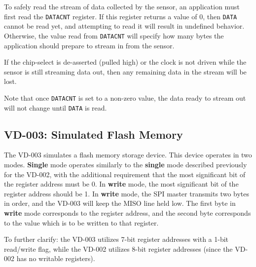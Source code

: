 \documentclass{article}
\begin{document}
To safely read the stream of data collected by the sensor, an application must
first read the \texttt{DATACNT} register. If this register returns a value of
0, then \texttt{DATA} cannot be read yet, and attempting to read it will result
in undefined behavior. Otherwise, the value read from \texttt{DATACNT} will
specify how many bytes the application should prepare to stream in from the
sensor.

If the chip-select is de-asserted (pulled high) or the clock is not driven
while the sensor is still streaming data out, then any remaining data in the
stream will be lost.

Note that once \texttt{DATACNT} is set to a non-zero value, the data ready to
stream out will not change until \texttt{DATA} is read.

\subsection{VD-003: Simulated Flash Memory}

The VD-003 simulates a flash memory storage device. This device operates in two
modes.  \textbf{Single} mode operates similarly to the \textbf{single} mode
described previously for the VD-002, with the additional requirement that the
most significant bit of the register address must be 0. In \textbf{write} mode,
the most significant bit of the register address should be 1. In \textbf{write}
mode, the SPI master transmits two bytes in order, and the VD-003 will keep the
MISO line held low. The first byte in \textbf{write} mode corresponds to the
register address, and the second byte corresponds to the value which is to be
written to that register.

To further clarify: the VD-003 utilizes 7-bit register addresses with a 1-bit
read/write flag, while the VD-002 utilizes 8-bit register addresses (since the
VD-002 has no writable registers).
\end{document}
